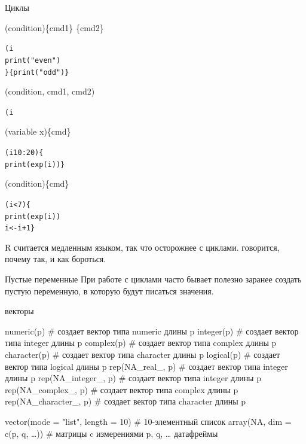 \begin{frame}[fragile]{Циклы}
\begin{itemize}
\mytem {\color{red!13!blue}{if}}(condition)\{cmd1\} {\color{red!27!green}{else}}\{cmd2\}
\footnotesize 
\begin{alltt}
{\color{red!13!blue}{if}}(i %
  print("even")
  \} {\color{red!27!green}{else}} \{print("odd")\}
\end{alltt}
\normalsize
\vfill
\mytem {\color{red!13!blue}{ifelse}}(condition, cmd1, cmd2)
\footnotesize 
\begin{alltt}
{\color{red!13!blue}{ifelse}}(i %
\end{alltt}
\normalsize
\vfill
\mytem {\color{red!13!blue}{for}}(variable {\color{red!27!green}{in}} x)\{cmd\}
\footnotesize 
\begin{alltt}
{\color{red!13!blue}{for}}(i {\color{red!27!green}{in}} 10:20)\{
  print(exp(i))\}
\end{alltt}
\normalsize
\vfill
\mytem {\color{red!13!blue}{while}}(condition)\{cmd\}
\footnotesize 
\begin{alltt}
{\color{red!13!blue}{while}}(i < 7)\{
  print(exp(i))
  i <- i+1\}
\end{alltt}
\normalsize
\end{itemize}
\vfill
R считается медленным языком, так что осторожнее с циклами. \href{http://adv-r.had.co.nz/Performance.html}{\color{red!13!blue}{В книге H. Wickham Advanced R}}{} говорится, почему так, и как бороться.
\end{frame}
\begin{frame}[fragile]{Пустые переменные}
При работе с циклами часто бывает полезно заранее создать пустую переменную, в которую будут писаться значения. \vfill
\begin{itemize}
\mytem векторы
\begin{itemize}
\mytem numeric(p) \hfill \# создает вектор типа numeric длины p
\mytem integer(p) \hfill \# создает вектор типа integer длины p
\mytem complex(p) \hfill \# создает вектор типа complex длины p
\mytem character(p) \hfill \# создает вектор типа character длины p
\mytem logical(p) \hfill \# создает вектор типа logical длины p
\mytem rep(NA\_real\_, p) \hfill \# создает вектор типа integer длины p
\mytem rep(NA\_integer\_, p) \hfill \# создает вектор типа integer длины p
\mytem rep(NA\_complex\_, p) \hfill \# создает вектор типа complex длины p
\mytem rep(NA\_character\_, p) \hfill \# создает вектор типа character длины p
\end{itemize} \vfill
\mytem vector(mode = "list", length = 10) \hfill \# 10-элементный список \vfill
\mytem array(NA, dim = c(p, q, \dots)) \hfill \# матрицы c измерениями p, q, \dots \vfill
\mytem датафреймы
\end{itemize}
\end{frame}
